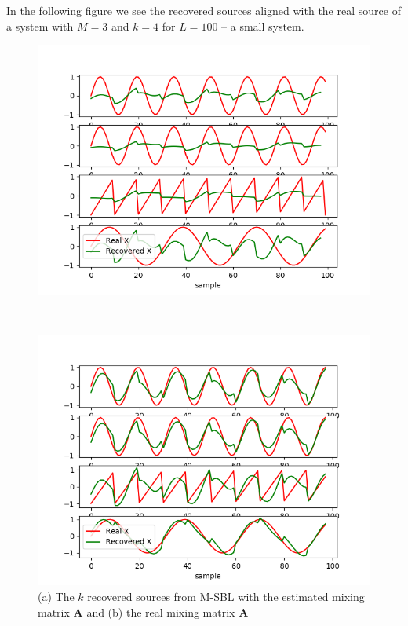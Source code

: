 In the following figure we see the recovered sources aligned with the real source of a system with $M = 3$ and $k = 4$ for $L = 100$ -- a small system.
\begin{figure}[H]
    \begin{minipage}{0.5\linewidth}
    	\centering
        \includegraphics[scale=0.5]{figures/chapter6/test_of_algo_mix_data.png}
		\subcaption{}
    \end{minipage} 
    ~\hfill~
    \begin{minipage}{0.5\linewidth}
    	\centering
        \includegraphics[scale=0.5]{figures/chapter6/test_of_algo_mix_data_realA.png}
        \subcaption{}
    \end{minipage}
    \caption{(a) The $k$ recovered sources from M-SBL with the estimated mixing matrix $\mathbf{A}$ and (b) the real mixing matrix $\mathbf{A}$}
    \label{fig:test_toy}
\end{figure}
